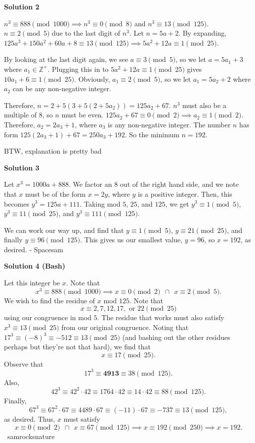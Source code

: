 \begin{enumerate}
\textbf{Solution 2}

$n^3 \equiv 888 \pmod{1000} \implies n^3 \equiv 0 \pmod 8$ and $n^3 \equiv 13 \pmod{125}$.$n \equiv 2 \pmod 5$ due to the last digit of $n^3$. Let $n = 5a + 2$. By expanding, $125a^3 + 150a^2 + 60a + 8 \equiv 13 \pmod{125} \implies 5a^2 + 12a \equiv 1 \pmod{25}$. 

 By looking at the last digit again, we see $a \equiv 3 \pmod5$, so we let $a = 5a_1 + 3$ where $a_1 \in \mathbb{Z^+}$. Plugging this in to $5a^2 + 12a \equiv 1 \pmod{25}$ gives $10a_1 + 6 \equiv 1 \pmod{25}$. Obviously, $a_1 \equiv 2 \pmod 5$, so we let $a_1 = 5a_2 + 2$ where $a_2$ can be any non-negative integer. 

 Therefore, $n = 2 + 5(3+ 5(2+5a_2)) = 125a_2 + 67$. $n^3$ must also be a multiple of $8$, so $n$ must be even. $125a_2 + 67 \equiv 0 \pmod 2 \implies a_2 \equiv 1 \pmod 2$. Therefore, $a_2 = 2a_3 + 1$, where $a_3$ is any non-negative integer. The number $n$ has form $125(2a_3+1)+67 = 250a_3+192$. So the minimum $n = \boxed{192}$.

 BTW, explanation is pretty bad

 



\textbf{Solution 3}

Let $x^3 = 1000a + 888$. We factor an $8$ out of the right hand side, and we note that $x$ must be of the form $x = 2y$, where $y$ is a positive integer. Then, this becomes $y^3 = 125a + 111$. Taking mod $5$, $25$, and $125$, we get $y^3 \equiv 1\pmod 5$, $y^3 \equiv 11\pmod{25}$, and $y^3 \equiv 111\pmod{125}$. 

 We can work our way up, and find that $y\equiv 1\pmod 5$, $y\equiv 21\pmod{25}$, and finally $y\equiv 96\pmod{125}$. This gives us our smallest value, $y = 96$, so $x = \boxed{192}$, as desired. - Spacesam

 



\textbf{Solution 4 (Bash)}

Let this integer be $x.$ Note that 
 \[x^3 \equiv 888 \pmod{1000} \implies x \equiv 0 \pmod {2}~~ \cap ~~ x \equiv 2 \pmod{5}.\] We wish to find the residue of $x$ mod $125.$ Note that 
 \[x \equiv 2,7,12,17, \text{ or } 22 \pmod{25}\] using our congruence in mod $5.$ The residue that works must also satisfy $x^3 \equiv 13 \pmod{25}$ from our original congruence. Noting that $17^3 \equiv (-8)^3 \equiv -512 \equiv 13 \pmod{25}$ (and bashing out the other residues perhaps but they're not that hard), we find that 
 \[x \equiv 17 \pmod{25}.\] Observe that 
 \[17^3 \equiv \mathbf{4913} \equiv 38 \pmod{125}.\] Also, 
 \[42^3 \equiv 42^2 \cdot 42 \equiv 1764 \cdot 42 \equiv 14 \cdot 42 \equiv 88 \pmod{125}.\] Finally, 
 \[67^3 \equiv 67^2 \cdot 67 \equiv 4489 \cdot 67 \equiv (-11) \cdot 67 \equiv -737 \equiv 13 \pmod{125},\] as desired. Thus, $x$ must satisfy 
 \[x \equiv 0 \pmod{2}~~ \cap ~~x \equiv 67 \pmod{125} \implies x \equiv 192 \pmod{250} \implies x=\boxed{192}.\] ~samrocksnature


\end{enumerate}
